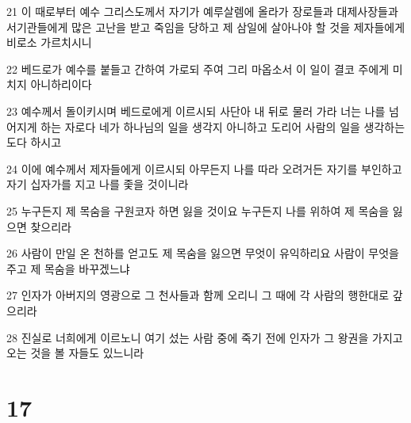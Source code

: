 \par 21 이 때로부터 예수 그리스도께서 자기가 예루살렘에 올라가 장로들과 대제사장들과 서기관들에게 많은 고난을 받고 죽임을 당하고 제 삼일에 살아나야 할 것을 제자들에게 비로소 가르치시니
\par 22 베드로가 예수를 붙들고 간하여 가로되 주여 그리 마옵소서 이 일이 결코 주에게 미치지 아니하리이다
\par 23 예수께서 돌이키시며 베드로에게 이르시되 사단아 내 뒤로 물러 가라 너는 나를 넘어지게 하는 자로다 네가 하나님의 일을 생각지 아니하고 도리어 사람의 일을 생각하는도다 하시고
\par 24 이에 예수께서 제자들에게 이르시되 아무든지 나를 따라 오려거든 자기를 부인하고 자기 십자가를 지고 나를 좇을 것이니라
\par 25 누구든지 제 목숨을 구원코자 하면 잃을 것이요 누구든지 나를 위하여 제 목숨을 잃으면 찾으리라
\par 26 사람이 만일 온 천하를 얻고도 제 목숨을 잃으면 무엇이 유익하리요 사람이 무엇을 주고 제 목숨을 바꾸겠느냐
\par 27 인자가 아버지의 영광으로 그 천사들과 함께 오리니 그 때에 각 사람의 행한대로 갚으리라
\par 28 진실로 너희에게 이르노니 여기 섰는 사람 중에 죽기 전에 인자가 그 왕권을 가지고 오는 것을 볼 자들도 있느니라

\chapter{17}

